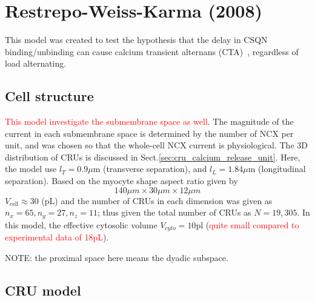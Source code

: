 \section{Restrepo-Weiss-Karma (2008)}
\label{sec:restrepo-weiss-karma}

This model was created to test the hypothesis that the delay in CSQN
binding/unbinding can cause calcium transient alternans
(CTA)~\citep{restrepo2008cmm}, regardless of  load
alternating. 

\subsection{Cell structure} 

\textcolor{red}{This model investigate the submembrane space as well}. The
magnitude of the current in each submembrane space is determined by the number
of NCX per unit, and was chosen so that the whole-cell NCX current is
physiological. The 3D distribution of CRUs is discussed in
Sect.\ref{sec:cru_calcium_release_unit}. Here, the model use $l_T=0.9\mu$m
(transverse separation), and $l_L=1.84\mu$m (longitudinal separation). Based on
the myocyte shape aspect ratio given by ~\citep{satoh1996svr}
\begin{equation}
  \label{eq:870}
  140\mu m \times 30 \mu m \times 12 \mu m
\end{equation}
$V_\text{cell}\approx 30$ (pL) and the number of CRUs in each dimension was
given as $n_x=65, n_y=27, n_z = 11$; thus given the total number of CRUs as
$N=19,305$.  In this model, the effective cytosolic volume $V_{cyto}=10$pl
(\textcolor{red}{quite small compared to experimental data of 18pL}). 

NOTE: the proximal space here means the dyadic subspace.

\subsection{CRU model}

